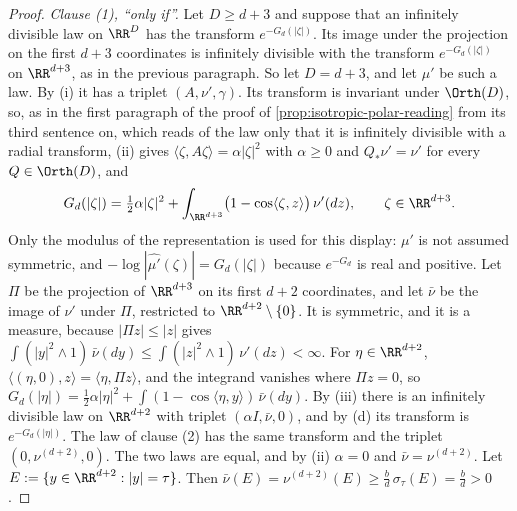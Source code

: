 \begin{proof}
\emph{Clause (1), ``only if''.} Let $D \ge d + 3$ and suppose that an infinitely divisible law on
$\RR^D$ has the transform $e^{-G_d(|\zeta|)}$. Its image under the projection on the first
$d + 3$ coordinates is infinitely divisible with the transform $e^{-G_d(|\zeta|)}$ on
$\RR^{d+3}$, as in the previous paragraph. So let $D = d + 3$, and let $\mu'$ be such a law. By
(i) it has a triplet $(A,\nu',\gamma)$. Its transform is invariant under $\Orth(D)$,
so, as in the first paragraph of the proof of \ref{prop:isotropic-polar-reading} from its
third sentence on, which reads of
the law only that it is infinitely divisible with a radial transform, (ii) gives
$\langle\zeta,A\zeta\rangle = \alpha|\zeta|^2$ with $\alpha \ge 0$ and $Q_*\nu' = \nu'$ for every
$Q \in \Orth(D)$, and
\[
  G_d(|\zeta|) = \tfrac12\alpha|\zeta|^2
     + \int_{\RR^{d+3}}\bigl(1 - \cos\langle\zeta,z\rangle\bigr)\,\nu'(dz), \qquad \zeta \in \RR^{d+3} .
\]
Only the modulus of the representation is used for this display: $\mu'$ is not assumed
symmetric, and $-\log|\widehat{\mu'}(\zeta)| = G_d(|\zeta|)$ because $e^{-G_d}$ is real and
positive.
Let $\Pi$ be the projection of $\RR^{d+3}$ on its first $d + 2$ coordinates, and let $\bar\nu$ be
the image of $\nu'$ under $\Pi$, restricted to $\RR^{d+2} \setminus \{0\}$. It is symmetric, and
it is a \Levy{} measure, because $|\Pi z| \le |z|$ gives
$\int(|y|^2 \wedge 1)\,\bar\nu(dy) \le \int(|z|^2 \wedge 1)\,\nu'(dz) < \infty$. For
$\eta \in \RR^{d+2}$, $\langle(\eta,0),z\rangle = \langle\eta,\Pi z\rangle$, and the integrand
vanishes where $\Pi z = 0$, so
$G_d(|\eta|) = \tfrac12\alpha|\eta|^2 + \int(1 - \cos\langle\eta,y\rangle)\,\bar\nu(dy)$. By
(iii) there is an infinitely divisible law on $\RR^{d+2}$ with triplet
$(\alpha I,\bar\nu,0)$, and by (d) its transform is $e^{-G_d(|\eta|)}$. The law of clause (2) has the
same transform and the triplet $(0,\nu^{(d+2)},0)$. The two laws are equal, and by
(ii) $\alpha = 0$ and $\bar\nu = \nu^{(d+2)}$. Let
$E := \{y \in \RR^{d+2} : |y| = \tau\}$. Then
$\bar\nu(E) = \nu^{(d+2)}(E) \ge \tfrac{b}{d}\,\sigma_\tau(E) = \tfrac{b}{d} > 0$.


\end{proof}
